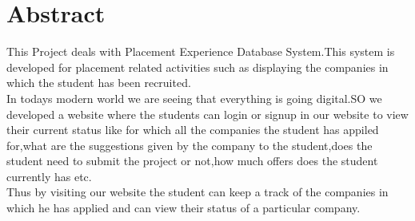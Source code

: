 \chapter*{Abstract}%
%
This Project deals with Placement Experience Database System.This system is developed for placement related activities such as displaying the companies in which the student has been recruited.\\
In todays modern world we are seeing that everything is going digital.SO we developed a website where the students can login or signup in our website to view their current status like for which all the companies the student has appiled for,what are the suggestions given by the company to the student,does the student need to submit the project or not,how much offers does the student currently has etc.
\\
Thus by visiting our website the student can keep a track of the companies in which he has applied  and can view their status of a particular company.
\thispagestyle{plain}

